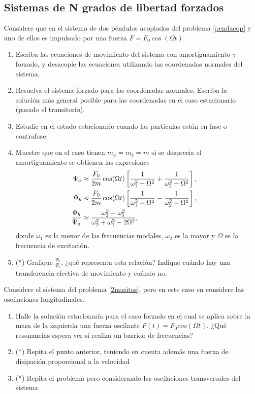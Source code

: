 \subsection*{Sistemas de N grados de libertad forzados}


\item Considere que en el sistema de dos péndulos acoplados del problema \ref{pendacop} y uno de ellos es impulsado por una fuerza $F= F_0 \cos(\Omega t)$.  
\begin{enumerate}
	\item Escriba las ecuaciones de movimiento del sistema con amortiguamiento y forzado, y desacople las ecuaciones utilizando las coordenadas normales del sistema.
	\item Resuelva el sistema forzado para las coordenadas normales. Escriba la solución más general posible para las coordenadas en el caso estacionario (pasado el transitorio).
	\item Estudie en el estado estacionario cuando las partículas están en fase o contrafase.
	\item Muestre que en el caso tienen $m_a= m_b= m$ si se  desprecia el amortiguamiento se obtienen las expresiones
	\[
		\begin{aligned}
			\Psi_a &\approx \frac{F_0}{2m} \cos(\Omega t) \left[ \frac{1}{\omega_1^2 - \Omega^2 } + \frac{1}{\omega_2^2 -\Omega^2} \right], \notag \\
			\Psi_b &\approx \frac{F_0}{2m} \cos(\Omega t) \left[ \frac{1}{\omega_1^2 - \Omega^2 } - \frac{1}{\omega_2^2 -\Omega^2} \right], \notag \\
			\frac{\Psi_b}{\Psi_a} &\approx \frac{\omega_2^2 - \omega_1^2}{\omega_2^2 + \omega_1^2 - 2 \Omega^2}, \notag
		\end{aligned}
	\]
	donde $\omega_1$ es la menor de las frecuencias modales, $\omega_2$ es la mayor y $\Omega$ es la frecuencia de excitación.
	\item (*) Grafique $\frac{\Psi_b}{\Psi_a}$, ¿qué representa esta relación?
	Indique cuándo hay una transferencia efectiva de movimiento y cuándo no.
\end{enumerate}


\item Considere el sistema del problema \ref{2masitas}, pero en este caso en considere las oscilaciones longitudinales.
\begin{enumerate}
    \item Halle la solución estacionaria para el caso forzado en el cual se aplica sobre la masa de la izquierda una fuerza oscilante $F(t)= F_0 cos(\Omega t)$.
		¿Qué resonancias espera ver si realiza un barrido de frecuencias?
		\item (*) Repita el punto anterior, teniendo en cuenta además una fuerza de disipación proporcional a la velocidad
		\item (*) Repita el problema pero considerando las oscilaciones transversales del sistema
\end{enumerate}



